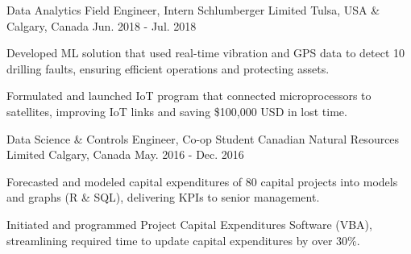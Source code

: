 \begin{cventries}
  \cventry
    {Data Analytics Field Engineer, Intern} %
    {Schlumberger Limited} %
    {Tulsa, USA \& Calgary, Canada} %
    {Jun. 2018 - Jul. 2018} %
    {
      \begin{cvitems} %
        \item {Developed ML solution that used real-time vibration and GPS data to detect 10 drilling faults, ensuring efficient operations and protecting assets.}
        \item {Formulated and launched IoT program that connected microprocessors to satellites, improving IoT links and saving \$100,000 USD in lost time.}
      \end{cvitems}
    }

  \cventry
    {Data Science \& Controls Engineer, Co-op Student} %
    {Canadian Natural Resources Limited} %
    {Calgary, Canada} %
    {May. 2016 - Dec. 2016} %
    {
      \begin{cvitems} %
        \item {Forecasted and modeled capital expenditures of 80 capital projects into models and graphs (R \& SQL), delivering KPIs to senior management.}
        \item {Initiated and programmed Project Capital Expenditures Software (VBA), streamlining required time to update capital expenditures by over 30\%.}
      \end{cvitems}
    }



\end{cventries}
